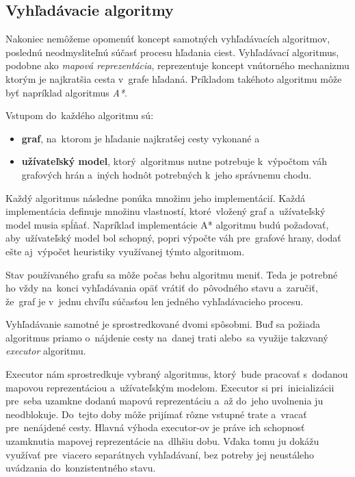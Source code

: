 \subsection{Vyhľadávacie algoritmy}\label{vyhladavacie_algoritmy}

Nakoniec nemôžeme opomenúť koncept samotných vyhľadávacích algoritmov, poslednú neodmysliteľnú súčasť procesu hľadania ciest. Vyhľadávací algoritmus, podobne ako \textit{mapová reprezentácia}, reprezentuje koncept vnútorného mechanizmu ktorým je najkratšia cesta v~grafe hľadaná. Príkladom takéhoto algoritmu môže byť napríklad algoritmus \textit{A*}. 

Vstupom do~každého algoritmu sú:
\begin{itemize}
    \item \textbf{graf}, na~ktorom je hľadanie najkratšej cesty vykonané a~
    \item \textbf{užívateľský model}, ktorý~algoritmus nutne potrebuje k~výpočtom váh grafových hrán a~iných hodnôt potrebných k~jeho správnemu chodu.  
\end{itemize}

Každý algoritmus následne ponúka množinu jeho implementácií. Každá implementácia definuje množinu vlastností, ktoré~vložený graf a~užívateľský model musia spĺňať. Napríklad implementácie A* algoritmu budú požadovať, aby~užívateľský model bol schopný, popri výpočte váh pre~grafové hrany, dodať ešte aj~výpočet heuristiky využívanej týmto algoritmom.

Stav používaného grafu sa môže počas behu algoritmu meniť. Teda je potrebné ho vždy na~konci vyhľadávania opäť vrátiť do~pôvodného stavu a~zaručiť, že~graf je v~jednu chvíľu súčasťou len jedného vyhľadávacieho procesu.

Vyhľadávanie samotné je sprostredkované dvomi spôsobmi. Buď sa požiada algoritmus priamo o~nájdenie cesty na~danej trati alebo~sa využije takzvaný \textit{executor} algoritmu. 

Executor nám sprostredkuje vybraný algoritmus, ktorý~bude pracovať s~dodanou mapovou reprezentáciou a~užívateľským modelom. Executor si pri~inicializácii pre~seba uzamkne dodanú mapovú reprezentáciu a~až do~jeho uvolnenia ju neodblokuje. Do~tejto doby môže prijímať rôzne vstupné trate a~vracať pre~nenájdené cesty. Hlavná výhoda executor-ov je práve ich schopnosť uzamknutia mapovej reprezentácie na~dlhšiu dobu. Vďaka tomu ju dokážu využívať pre~viacero separátnych vyhľadávaní, bez potreby jej neustáleho uvádzania do~konzistentného stavu.  

